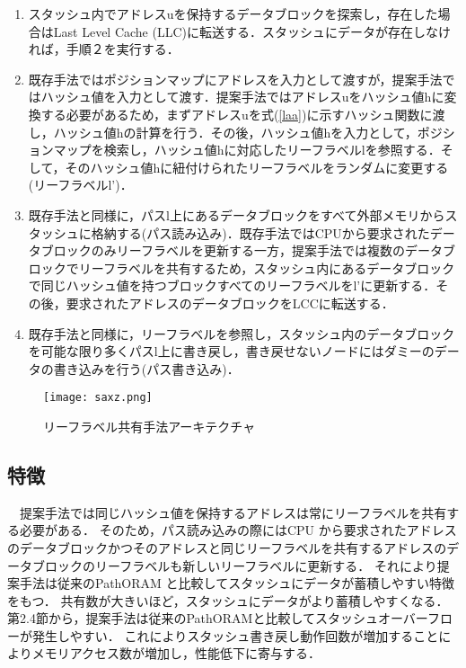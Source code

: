 \documentclass{jarticle}
\begin{document}
\begin{enumerate}
  \item 	スタッシュ内でアドレスuを保持するデータブロックを探索し，存在した場合はLast Level Cache (LLC)に転送する．スタッシュにデータが存在しなければ，手順２を実行する．

  \item 	既存手法ではポジションマップにアドレスを入力として渡すが，提案手法ではハッシュ値を入力として渡す．提案手法ではアドレスuをハッシュ値hに変換する必要があるため，まずアドレスuを式(\ref{laa})に示すハッシュ関数に渡し，ハッシュ値hの計算を行う．その後，ハッシュ値hを入力として，ポジションマップを検索し，ハッシュ値hに対応したリーフラベルlを参照する．そして，そのハッシュ値hに紐付けられたリーフラベルをランダムに変更する(リーフラベルl’)．

  \item 	既存手法と同様に，パスl上にあるデータブロックをすべて外部メモリからスタッシュに格納する(パス読み込み)．既存手法ではCPUから要求されたデータブロックのみリーフラベルを更新する一方，提案手法では複数のデータブロックでリーフラベルを共有するため，スタッシュ内にあるデータブロックで同じハッシュ値を持つブロックすべてのリーフラベルをl’に更新する．その後，要求されたアドレスのデータブロックをLCCに転送する．

  \item 	既存手法と同様に，リーフラベルを参照し，スタッシュ内のデータブロックを可能な限り多くパスl上に書き戻し，書き戻せないノードにはダミーのデータの書き込みを行う(パス書き込み)．
  

\end{enumerate}


\begin{figure}[t]
  \texttt{[image: saxz.png]}
  \caption{リーフラベル共有手法アーキテクチャ}
  \label{treesa}
\end{figure}

\subsection{特徴}
　提案手法では同じハッシュ値を保持するアドレスは常にリーフラベルを共有する必要がある．
%
そのため，パス読み込みの際にはCPU から要求されたアドレスのデータブロックかつそのアドレスと同じリーフラベルを共有するアドレスのデータブロックのリーフラベルも新しいリーフラベルに更新する．
それにより提案手法は従来のPathORAM と比較してスタッシュにデータが蓄積しやすい特徴をもつ．
共有数が大きいほど，スタッシュにデータがより蓄積しやすくなる．
第2.4節から，提案手法は従来のPathORAMと比較してスタッシュオーバーフローが発生しやすい．
これによりスタッシュ書き戻し動作回数が増加することによりメモリアクセス数が増加し，性能低下に寄与する．
\end{document}
